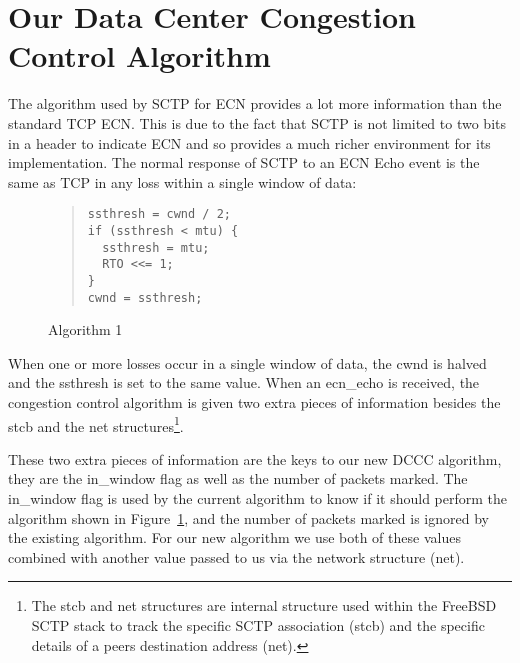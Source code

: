 \documentclass[12pt]{article}
\begin{document}
\section{Our Data Center Congestion Control Algorithm}
\label{algo}
The algorithm used by SCTP for ECN provides a lot more information than
the standard TCP ECN. This is due to the fact that SCTP is not limited to two bits
in a header to indicate ECN and so provides a much richer environment for its
implementation. The normal response of SCTP to an ECN Echo event is the same
as TCP in any loss within a single window of data:

\begin{figure}[!h]
\begin{quote}
\begin{verbatim}
ssthresh = cwnd / 2;
if (ssthresh < mtu) {
  ssthresh = mtu;
  RTO <<= 1;
}
cwnd = ssthresh;
\end{verbatim}
\end{quote}
\caption{Algorithm 1}
\label{algo1}
\end{figure}



When one or more losses occur in a single window of data, the cwnd is halved and
the ssthresh is set to the same value. When an ecn\_echo is received, the congestion
control algorithm is given two extra pieces of information besides the stcb and the 
net structures\footnote{The stcb and net structures are internal structure used within the FreeBSD SCTP
stack to track the specific SCTP association (stcb) and the specific details of a peers destination
address (net).}.

These two extra pieces of information are the keys to our new DCCC algorithm, they are
the in\_window flag as well as the number of packets marked. The in\_window flag
is used by the current algorithm to know if it should perform the
algorithm shown in Figure~\ref{algo1},  and
the number of packets marked is ignored by the existing algorithm. For
our new algorithm we use both of these values combined with another value passed
to us via the network structure (net).
\end{document}
